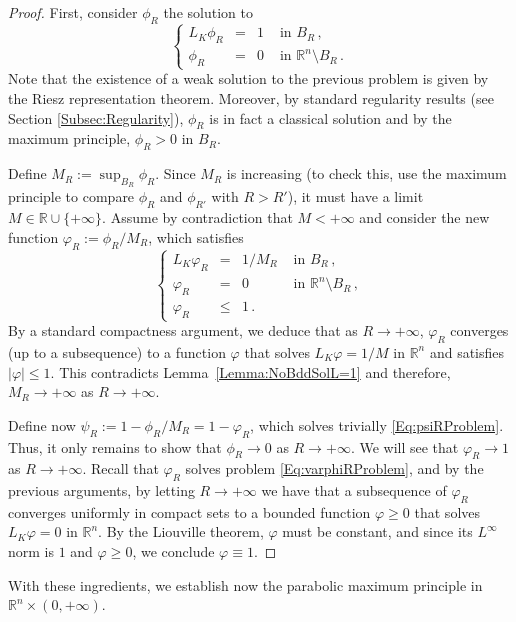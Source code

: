 \documentclass[12pt,reqno]{amsart}
\theoremstyle{definition}
\theoremstyle{remark}
\newcommand{\con}[1]{\mathbb{#1}}
\newcommand{\R}{\con{R}} %
\newcommand\beqc[1]{\left\{\begin{array}{#1}}
\newcommand\eeqc{\end{array} \right.}
\def\PDEsystem{rcll}
\numberwithin{equation}{section}
\begin{document}
\begin{proof}
	First, consider $\phi_R$ the solution to
	\begin{equation*}
	\beqc{\PDEsystem}
	L_K  \phi_R &=& 1 & \textrm{ in } B_R\,,\\
	\phi_R &=& 0 & \textrm{ in } \R^n\setminus B_R\,.
	\eeqc
	\end{equation*}
	Note that the existence of a weak solution to the previous problem is given by the Riesz representation theorem. Moreover, by standard regularity results (see Section \ref{Subsec:Regularity}), $\phi_R$ is in fact a classical solution and by the maximum principle, $\phi_R>0$ in $B_R$.
	
	Define $M_R := \sup_{B_R} \phi_R$. Since $M_R$ is increasing (to check this, use the maximum principle to compare $\phi_R$ and $\phi_{R'}$ with $R>R'$), it must have a limit $M\in \R \cup \{+\infty\}$. Assume by contradiction that $M<+\infty$ and consider the new function $ \varphi_R := \phi_R/M_R$, which satisfies
	\begin{equation}
	\label{Eq:varphiRProblem}
	\beqc{\PDEsystem}
	L_K  \varphi_R &=& 1/M_R & \textrm{ in } B_R\,,\\
	\varphi_R &=& 0 & \textrm{ in } \R^n\setminus B_R\,, \\
	\varphi_R &\leq & 1\,.
	\eeqc
	\end{equation}
	By a standard compactness argument, we deduce that as $R\to +\infty$, $\varphi_R$ converges (up to a subsequence) to a function $\varphi$ that solves $L_K  \varphi = 1/M$ in $\R^n$ and satisfies  $|\varphi| \leq 1$. This contradicts Lemma~\ref{Lemma:NoBddSolL=1} and therefore, $M_R \to +\infty$ as $R\to +\infty$. 
	
	Define now $\psi_R := 1-\phi_R/M_R = 1-\varphi_R$, which solves trivially \eqref{Eq:psiRProblem}. Thus, it only remains to show that $\phi_R \to 0$ as $R\to +\infty$. We will see that $\varphi_R \to	1$  as $R\to +\infty$. Recall that $\varphi_R$ solves problem \eqref{Eq:varphiRProblem}, and by the previous arguments, by letting $R\to +\infty$ we have that a subsequence of $\varphi_R$ converges uniformly in compact sets to a bounded function $\varphi\geq 0$ that solves $ L_K \varphi = 0 $ in $\R^n$. By the Liouville theorem, $\varphi$ must be constant, and since its $L^\infty$ norm is $1$ and $\varphi\geq 0$, we conclude $\varphi\equiv 1$.	
\end{proof}

With these ingredients, we establish now the parabolic maximum principle in $\R^n \times (0,+\infty)$. 
\end{document}
